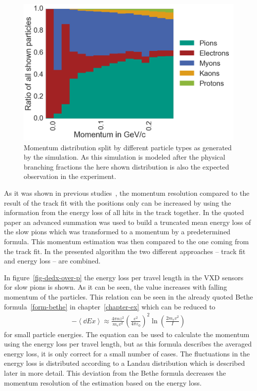 \begin{figure}
 \centering
 \includegraphics[width=0.8\linewidth]{figures/vxd/momentumDistribution.png}
 \caption[Momentum distribution by different particle types.]{Momentum distribution split by different particle types as generated by the simulation. As this simulation is modeled after the physical branching fractions the here shown distribution is also the expected observation in the experiment.}
 \label{fig-particles-momentum}
\end{figure}

As it was shown in previous studies~\cite{robert}, the momentum resolution compared to the result of the track fit with the positions only can be increased by using the information from the energy loss of all hits in the track together. In the quoted paper an advanced summation was used to build a truncated mean energy loss of the slow pions which was transformed to a momentum by a predetermined formula. This momentum estimation was then compared to the one coming from the track fit. In the presented algorithm the two different approaches -- track fit and energy loss -- are combined.

In figure~\ref{fig-dedx-over-p} the energy loss per travel length in the VXD sensors for slow pions is shown. As it can be seen, the \dedx value increases with falling momentum of the particles. This relation can be seen in the already quoted Bethe formula~\ref{form-bethe} in chapter~\ref{chapter-ex} which can be reduced to 
\begin{align}
 -\left \langle \dd{E}{x} \right\rangle \approx \frac{4 \pi n z^2}{m_e v^2} \left( \frac{e^2}{4 \pi \varepsilon_0} \right)^2 \ln \left( \frac{2 m_e v^2}{I} \right) \label{form-bethe-simpl}
\end{align}
for small particle energies. The equation can be used to calculate the momentum using the energy loss per travel length, but as this formula describes the averaged energy loss, it is only correct for a small number of cases. The fluctuations in the energy loss is distributed according to a Landau distribution which is described later in more detail. This deviation from the Bethe formula decreases the momentum resolution of the estimation based on the energy loss.

